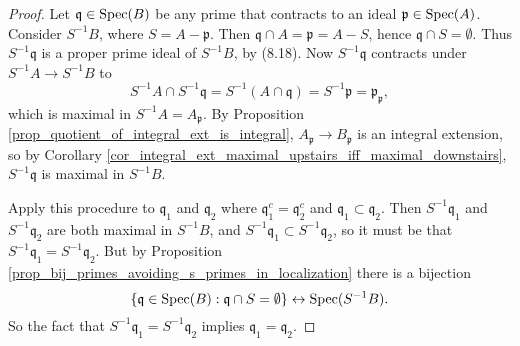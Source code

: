\documentclass[12pt]{article}
\begin{document}
\begin{proof}
	Let $\mathfrak{q}\in\text{Spec}(B)$ be any prime that contracts to an ideal $\mathfrak{p}\in\text{Spec}(A)$. Consider $S^{-1}B$, where $S=A-\mathfrak{p}$. Then $\mathfrak{q}\cap A=\mathfrak{p}=A-S$, hence $\mathfrak{q}\cap S=\emptyset$. Thus $S^{-1}\mathfrak{q}$ is a proper prime ideal of $S^{-1}B$, by (8.18). Now $S^{-1}\mathfrak{q}$ contracts under $S^{-1}A\to S^{-1}B$ to 
	\begin{equation*}
		S^{-1}A\cap S^{-1}\mathfrak{q} = S^{-1}(A\cap\mathfrak{q})=S^{-1}\mathfrak{p}=\mathfrak{p}_\mathfrak{p},
	\end{equation*}
	which is maximal in $S^{-1}A=A_\mathfrak{p}$. By Proposition \ref{prop_quotient_of_integral_ext_is_integral}, $A_\mathfrak{p}\to B_\mathfrak{p}$ is an integral extension, so by Corollary \ref{cor_integral_ext_maximal_upstairs_iff_maximal_downstairs}, $S^{-1}\mathfrak{q}$ is maximal in $S^{-1}B$.

	Apply this procedure to $\mathfrak{q}_1$ and $\mathfrak{q}_2$ where $\mathfrak{q}_1^c=\mathfrak{q}_2^c$ and $\mathfrak{q}_1\subset\mathfrak{q}_2$. Then $S^{-1}\mathfrak{q}_1$ and $S^{-1}\mathfrak{q}_2$ are both maximal in $S^{-1}B$, and $S^{-1}\mathfrak{q}_1\subset S^{-1}\mathfrak{q}_2$, so it must be that $S^{-1}\mathfrak{q}_1= S^{-1}\mathfrak{q}_2$. But by Proposition \ref{prop_bij_primes_avoiding_s_primes_in_localization} there is a bijection 
	\begin{equation*}
		\{\mathfrak{q}\in\text{Spec}(B) : \mathfrak{q}\cap S=\emptyset\} \leftrightarrow \text{Spec}(S^{-1}B).
	\end{equation*}
	So the fact that $S^{-1}\mathfrak{q}_1=S^{-1}\mathfrak{q}_2$ implies $\mathfrak{q}_1=\mathfrak{q}_2$.
\end{proof}
\end{document}
